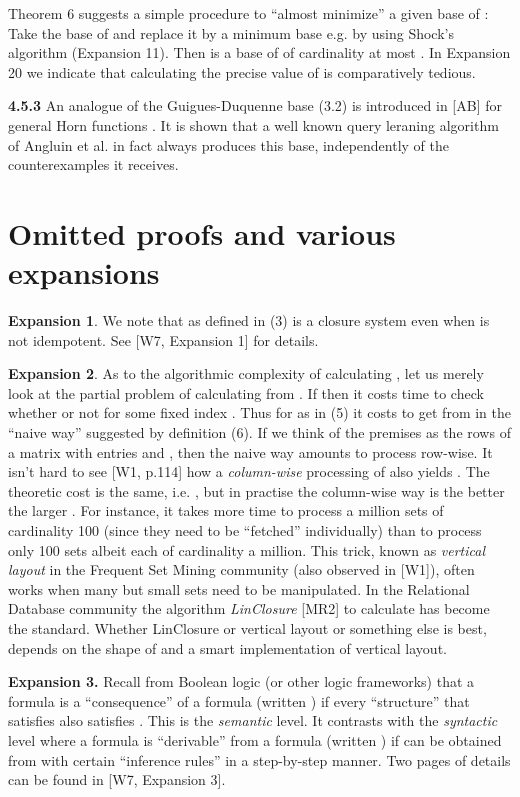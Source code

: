 \documentclass[11pt]{article}
\begin{document}
Theorem 6 suggests a simple procedure to ``almost minimize'' a given base  of : Take the base  of  and replace it by a minimum base  e.g. by using Shock's algorithm (Expansion 11). Then  is a base of  of cardinality at most . 
In Expansion 20 we indicate that calculating the precise value of  is comparatively tedious.


{\bf 4.5.3} An analogue of the Guigues-Duquenne base (3.2) is introduced in [AB] for general Horn functions . It is shown that a well known query leraning algorithm of Angluin et al. in fact always produces this base, independently of the counterexamples it receives.



\section{Omitted proofs and various expansions}




{\bf Expansion 1}. We note that  as defined in (3) is a closure system even when  is not idempotent. See [W7, Expansion 1] for details.




{\bf Expansion 2}. As to the algorithmic complexity of calculating , let us merely look at the partial problem of calculating  from . If  then it costs time  to check whether or not  for some fixed index . Thus for  as in (5) it costs  to get  from  in the ``naive way'' suggested by definition (6). If we think of the premises  as the rows of a  matrix  with entries  and , then the naive way amounts to process  row-wise. It isn't hard to see [W1, p.114] how a {\it column-wise} processing of  also yields . The theoretic cost is the same, i.e. , but in practise the column-wise way is the better the larger . For instance, it takes more time to process a million sets of cardinality 100 (since they need to be ``fetched'' individually) than to process only 100 sets albeit each of cardinality a million. This trick, known as {\it vertical layout} in the Frequent Set Mining community (also observed in [W1]), often works when many but small sets need to be manipulated. In the Relational Database community the algorithm {\it LinClosure} [MR2] to calculate  has become the standard. Whether LinClosure or vertical layout or something else is best, depends on the shape of  and a smart implementation of vertical layout. 


{\bf Expansion 3.} Recall from Boolean logic (or other logic frameworks) that a formula  is a ``consequence'' of a formula  (written ) if every ``structure'' that satisfies  also satisfies . This is the {\it semantic} level. It contrasts with the {\it syntactic} level where a formula  is ``derivable'' from a formula  (written ) if  can be obtained from  with certain ``inference rules'' in a step-by-step manner. Two pages of details can be found in [W7, Expansion 3].
\end{document}
